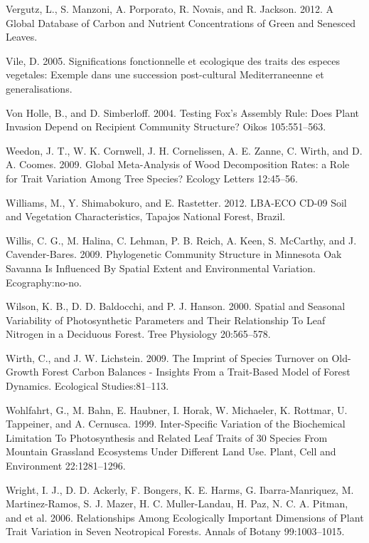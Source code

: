 \documentclass[11pt]{article}
\begin{document}
\begin{hangparas}{1.5em}{1}
\hypertarget{citeproc_bib_item_112}{Vergutz, L., S. Manzoni, A. Porporato, R. Novais, and R. Jackson. 2012. A Global Database of Carbon and Nutrient Concentrations of Green and Senesced Leaves.}

\hypertarget{citeproc_bib_item_113}{Vile, D. 2005. Significations fonctionnelle et ecologique des traits des especes vegetales: Exemple dans une succession post-cultural Mediterraneenne et generalisations.}

\hypertarget{citeproc_bib_item_114}{Von Holle, B., and D. Simberloff. 2004. Testing Fox’s Assembly Rule: Does Plant Invasion Depend on Recipient Community Structure? Oikos 105:551–563.}

\hypertarget{citeproc_bib_item_115}{Weedon, J. T., W. K. Cornwell, J. H. Cornelissen, A. E. Zanne, C. Wirth, and D. A. Coomes. 2009. Global Meta-Analysis of Wood Decomposition Rates: a Role for Trait Variation Among Tree Species? Ecology Letters 12:45–56.}

\hypertarget{citeproc_bib_item_116}{Williams, M., Y. Shimabokuro, and E. Rastetter. 2012. LBA-ECO CD-09 Soil and Vegetation Characteristics, Tapajos National Forest, Brazil.}

\hypertarget{citeproc_bib_item_117}{Willis, C. G., M. Halina, C. Lehman, P. B. Reich, A. Keen, S. McCarthy, and J. Cavender-Bares. 2009. Phylogenetic Community Structure in Minnesota Oak Savanna Is Influenced By Spatial Extent and Environmental Variation. Ecography:no-no.}

\hypertarget{citeproc_bib_item_118}{Wilson, K. B., D. D. Baldocchi, and P. J. Hanson. 2000. Spatial and Seasonal Variability of Photosynthetic Parameters and Their Relationship To Leaf Nitrogen in a Deciduous Forest. Tree Physiology 20:565–578.}

\hypertarget{citeproc_bib_item_119}{Wirth, C., and J. W. Lichstein. 2009. The Imprint of Species Turnover on Old-Growth Forest Carbon Balances - Insights From a Trait-Based Model of Forest Dynamics. Ecological Studies:81–113.}

\hypertarget{citeproc_bib_item_120}{Wohlfahrt, G., M. Bahn, E. Haubner, I. Horak, W. Michaeler, K. Rottmar, U. Tappeiner, and A. Cernusca. 1999. Inter-Specific Variation of the Biochemical Limitation To Photosynthesis and Related Leaf Traits of 30 Species From Mountain Grassland Ecosystems Under Different Land Use. Plant, Cell and Environment 22:1281–1296.}

\hypertarget{citeproc_bib_item_121}{Wright, I. J., D. D. Ackerly, F. Bongers, K. E. Harms, G. Ibarra-Manriquez, M. Martinez-Ramos, S. J. Mazer, H. C. Muller-Landau, H. Paz, N. C. A. Pitman, and et al. 2006. Relationships Among Ecologically Important Dimensions of Plant Trait Variation in Seven Neotropical Forests. Annals of Botany 99:1003–1015.}


\end{hangparas}
\end{document}
